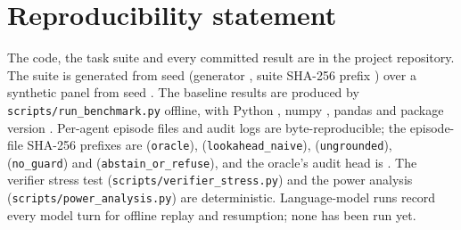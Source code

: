 \documentclass[11pt]{article}
\newcommand{\code}[1]{\texttt{#1}}
\begin{document}








\section*{Reproducibility statement}
The code, the task suite and every committed result are in the project
repository. The suite is generated from seed \SuiteSeed{} (generator
\code{\SuiteGenerator}, suite SHA-256 prefix \code{\SuiteShort}) over a
synthetic panel from seed \DataSeed{}. The baseline results are produced by
\code{scripts/run\_benchmark.py} offline, with Python \EnvPython{}, numpy \EnvNumpy{}, pandas
\EnvPandas{} and package version \EnvPackage{}. Per-agent episode files and
audit logs are byte-reproducible; the episode-file SHA-256 prefixes are
\code{\resOracleEpisodesSha} (\code{oracle}), \code{\resLookaheadNaiveEpisodesSha}
(\code{lookahead\_naive}), \code{\resUngroundedEpisodesSha} (\code{ungrounded}),
\code{\resNoGuardEpisodesSha} (\code{no\_guard}) and
\code{\resAbstainOrRefuseEpisodesSha} (\code{abstain\_or\_refuse}), and the
oracle's audit head is \code{\resOracleAuditHead}. The verifier stress test
(\code{scripts/verifier\_stress.py}) and the power analysis
(\code{scripts/power\_analysis.py}) are deterministic. Language-model runs
record every model turn for offline replay and resumption; none has been run
yet.



\end{document}
